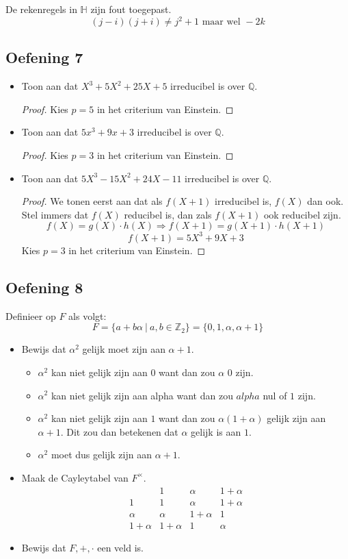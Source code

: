 \documentclass[main.tex]{subfiles}
\begin{document}
De rekenregels in $\mathbb{H}$ zijn fout toegepast.
\[ (j-i)(j+i) \neq j^{2}+1 \text{ maar wel } -2k \]


\subsection*{Oefening 7}
\begin{itemize}
\item Toon aan dat $X^{3}+5X^{2}+25X+5$ irreducibel is over $\mathbb{Q}$.
  \begin{proof}
    Kies $p=5$ in het criterium van Einstein.
  \end{proof}
\item Toon aan dat $5x^{3}+9x+3$ irreducibel is over $\mathbb{Q}$.
  \begin{proof}
    Kies $p=3$ in het criterium van Einstein.
  \end{proof}
\item Toon aan dat $5X^{3}-15X^{2}+24X-11$ irreducibel is over $\mathbb{Q}$.
  \begin{proof}
    We tonen eerst aan dat als $f(X+1)$ irreducibel is, $f(X)$ dan ook.
    Stel immers dat $f(X)$ reducibel is, dan zals $f(X+1)$ ook reducibel zijn.
    \[ f(X) = g(X) \cdot h(X) \Rightarrow f(X+1) = g(X+1) \cdot h(X+1)\]
    \[ f(X+1) = 5X^{3}+9X+3 \]
    Kies $p=3$ in het criterium van Einstein.
  \end{proof}
\end{itemize}


\subsection*{Oefening 8}

Definieer op $F$ als volgt:
\[ F = \{ a + b\alpha \ |\ a,b \in \mathbb{Z}_{2} \} = \{ 0,1,\alpha,\alpha+1 \} \]
\begin{itemize}
\item Bewijs dat $\alpha^{2}$ gelijk moet zijn aan $\alpha+1$.
  \begin{itemize}
  \item $\alpha^{2}$ kan niet gelijk zijn aan $0$ want dan zou $\alpha$ $0$ zijn.
  \item $\alpha^{2}$ kan niet gelijk zijn aan alpha want dan zou $alpha$ nul of $1$ zijn.
  \item $\alpha^{2}$ kan niet gelijk zijn aan $1$ want dan zou $\alpha(1+\alpha)$ gelijk zijn aan $\alpha+1$.
    Dit zou dan betekenen dat $\alpha$ gelijk is aan $1$.
  \item $\alpha^{2}$ moet dus gelijk zijn aan $\alpha+1$. 
  \end{itemize}
\item Maak de Cayleytabel van $F^{\times}$.
  \[
  \begin{array}{c|ccc}
    & 1 & \alpha & 1+\alpha\\ \hline
    1 & 1 & \alpha & 1 + \alpha\\
    \alpha & \alpha &1 + \alpha & 1\\
    1 + \alpha & 1 + \alpha & 1 & \alpha
  \end{array}
  \]
\item Bewijs dat $F,+,\cdot$ een veld is.
\end{itemize}
\end{document}
